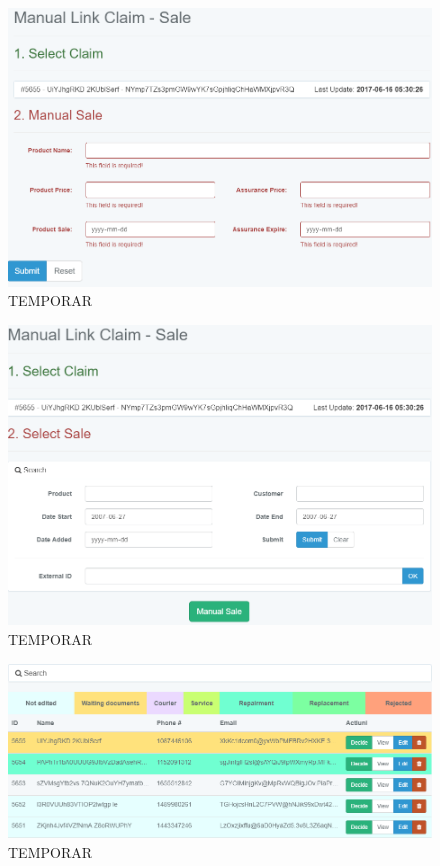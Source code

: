 	\begin{figure}
		\includegraphics[width=\linewidth]{../imagini/claims_manual_sale.png}
		\caption{TEMPORAR}
		\label{fig:TEMP}
	\end{figure}
	\begin{figure}
		\includegraphics[width=\linewidth]{../imagini/claims_match_sale.png}
		\caption{TEMPORAR}
		\label{fig:TEMP}
	\end{figure}
	\begin{figure}
		\includegraphics[width=\linewidth]{../imagini/claims_normal.png}
		\caption{TEMPORAR}
		\label{fig:TEMP}
	\end{figure}
